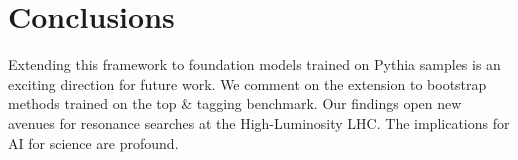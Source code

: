 \section{Conclusions}\label{sec:conclusions}

Extending this framework to foundation models trained on Pythia samples
is an exciting direction for future work. We comment on the extension to
bootstrap methods trained on the top & tagging benchmark. Our findings
open new avenues for resonance searches at the High-Luminosity LHC. The
implications for AI for science are profound.

